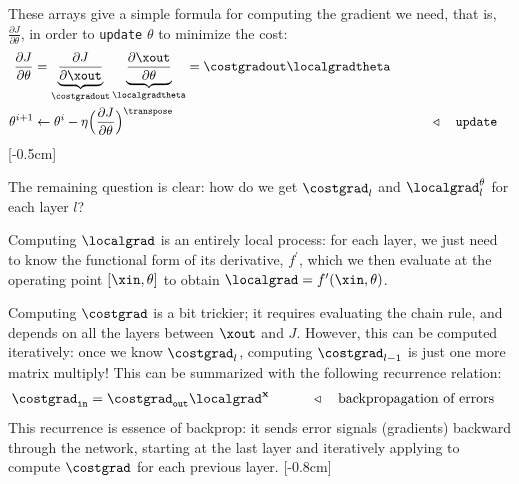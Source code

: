 These arrays give a simple formula for computing the gradient we need, that is, $\frac{\partial J}{\partial \theta}$, in order to \texttt{update} $\theta$ to minimize the cost:
\begin{align}
    \frac{\partial J}{\partial \theta} & = \underbrace{\frac{\partial J}{\partial \xout}}_{\costgradout} \underbrace{\frac{\partial \xout}{\partial \theta}}_{\localgradtheta} = \costgradout\localgradtheta                                                                                          \\
    \theta^{i+1}                       & \leftarrow \theta^{i} - \eta \Big(\frac{\partial J}{\partial \theta}\Big)^\transpose                                                                                &  & \quad\quad \triangleleft \quad \texttt{update} \label{eqn:backpropagation:djdtheta}
\end{align}
[-0.5cm]

The remaining question is clear: how do we get $\costgrad_l$ and $\localgrad^{\theta}_l$ for each layer $l$?

Computing $\localgrad$ is an entirely local process: for each layer, we just need to know the functional form of its derivative, $f^{\prime}$, which we then evaluate at the operating point $[\xin, \theta]$ to obtain $\localgrad = f^{\prime}(\xin,\theta)$.

Computing $\costgrad$ is a bit trickier; it requires evaluating the chain rule, and depends on all the layers between $\xout$ and $J$. However, this can be computed iteratively: once we know $\costgrad_l$, computing $\costgrad_{l-1}$ is just one more matrix multiply! This can be summarized with the following recurrence relation:
\begin{align}
    \costgrad_{\texttt{in}} & = \costgrad_{\texttt{out}}\localgrad^{\mathbf{x}} &  & \quad\quad \triangleleft \quad \text{backpropagation of errors}
    \label{eqn:backpropagation:backward}
\end{align}
This recurrence is essence of backprop: it sends error signals (gradients) backward through the network, starting at the last layer and iteratively applying \eqn{\ref{eqn:backpropagation:backward}} to
compute $\costgrad$ for each previous layer.
[-0.8cm]


